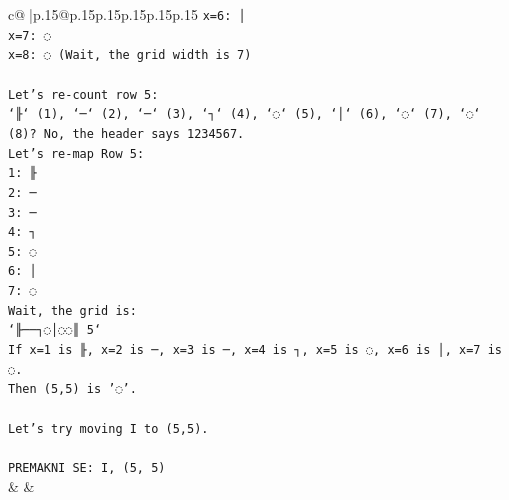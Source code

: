 \documentclass{article}
\begin{document}
{\begin{supertabular}{c@{$\;$}|p{.15\linewidth}@{}p{.15\linewidth}p{.15\linewidth}p{.15\linewidth}p{.15\linewidth}p{.15\linewidth}}
{{{\texttt{x=6: │} \\
\texttt{x=7: ◌} \\
\texttt{x=8: ◌ (Wait, the grid width is 7)} \\
\\ 
\texttt{Let's re{-}count row 5:} \\
\texttt{`╟` (1), `─` (2), `─` (3), `┐` (4), `◌` (5), `│` (6), `◌` (7), `◌` (8)? No, the header says 1234567.} \\
\texttt{Let's re{-}map Row 5:} \\
\texttt{1: ╟} \\
\texttt{2: ─} \\
\texttt{3: ─} \\
\texttt{4: ┐} \\
\texttt{5: ◌} \\
\texttt{6: │} \\
\texttt{7: ◌} \\
\texttt{Wait, the grid is:} \\
\texttt{`╟──┐◌│◌◌║ 5`} \\
\texttt{If x=1 is ╟, x=2 is ─, x=3 is ─, x=4 is ┐, x=5 is ◌, x=6 is │, x=7 is ◌.} \\
\texttt{Then (5,5) is '◌'.} \\
\\ 
\texttt{Let's try moving I to (5,5).} \\
\\ 
\texttt{PREMAKNI SE: I, (5, 5)} \\
            }
        }
    }
    & & \\ \\


\end{supertabular}}
\end{document}
